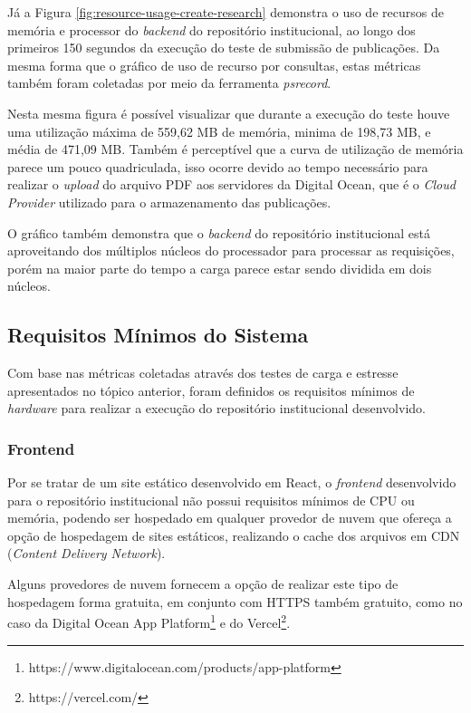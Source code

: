 Já a Figura \ref{fig:resource-usage-create-research} demonstra o uso de recursos
de memória e processor do \emph{backend} do repositório institucional, ao longo
dos primeiros 150 segundos da execução do teste de submissão de publicações.
Da mesma forma que o gráfico de uso de recurso por consultas, estas métricas
também foram coletadas por meio da ferramenta \emph{psrecord}.

Nesta mesma figura é possível visualizar que durante a execução do teste houve uma
utilização máxima de 559,62 MB de memória, minima de 198,73 MB, e média de 471,09 MB.
Também é perceptível que a curva de utilização de memória parece um pouco quadriculada,
isso ocorre devido ao tempo necessário para realizar o \emph{upload} do arquivo PDF
aos servidores da Digital Ocean, que é o \emph{Cloud Provider} utilizado para o
armazenamento das publicações.

O gráfico também demonstra que o \emph{backend} do repositório institucional
está aproveitando dos múltiplos núcleos do processador para processar as requisições,
porém na maior parte do tempo a carga parece estar sendo dividida em dois núcleos.

\subsection{Requisitos Mínimos do Sistema}

Com base nas métricas coletadas através dos testes de carga e estresse apresentados
no tópico anterior, foram definidos os requisitos mínimos de \emph{hardware}
para realizar a execução do repositório institucional desenvolvido.

\subsubsection{Frontend}

Por se tratar de um site estático desenvolvido em React, o \emph{frontend} desenvolvido
para o repositório institucional não possui requisitos mínimos de CPU ou memória, podendo
ser hospedado em qualquer provedor de nuvem que ofereça a opção de hospedagem de sites
estáticos, realizando o cache dos arquivos em CDN (\emph{Content Delivery Network}).

Alguns provedores de nuvem fornecem a opção de realizar este tipo de hospedagem forma
gratuita, em conjunto com HTTPS também gratuito, como no caso da Digital Ocean App Platform\footnote{https://www.digitalocean.com/products/app-platform}
e do Vercel\footnote{https://vercel.com/}.

